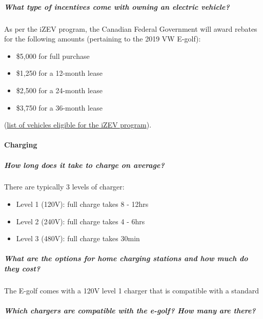 \documentclass[]{article}
\providecommand{\tightlist}{%
  \setlength{\itemsep}{0pt}\setlength{\parskip}{0pt}}
\let\oldparagraph\paragraph
\renewcommand{\paragraph}[1]{\oldparagraph{#1}\mbox{}}
\let\oldsubparagraph\subparagraph
\renewcommand{\subparagraph}[1]{\oldsubparagraph{#1}\mbox{}}
\begin{document}
\hypertarget{what-type-of-incentives-come-with-owning-an-electric-vehicle}{%
\subparagraph{What type of incentives come with owning an electric
vehicle?}\label{what-type-of-incentives-come-with-owning-an-electric-vehicle}}

As per the iZEV program, the Canadian Federal Government will award
rebates for the following amounts (pertaining to the 2019 VW E-golf):

\begin{itemize}
\tightlist
\item
  \$5,000 for full purchase
\item
  \$1,250 for a 12-month lease
\item
  \$2,500 for a 24-month lease
\item
  \$3,750 for a 36-month lease
\end{itemize}

(\href{https://www.tc.gc.ca/en/services/road/innovative-technologies/list-eligible-vehicles-under-izev-program.html}{list
of vehicles eligible for the iZEV program}).

\hypertarget{charging}{%
\paragraph{Charging}\label{charging}}

\hypertarget{how-long-does-it-take-to-charge-on-average}{%
\subparagraph{How long does it take to charge on
average?}\label{how-long-does-it-take-to-charge-on-average}}

There are typically 3 levels of charger:

\begin{itemize}
\item
  Level 1 (120V): full charge takes 8 - 12hrs
\item
  Level 2 (240V): full charge takes 4 - 6hrs
\item
  Level 3 (480V): full charge takes 30min
\end{itemize}

\hypertarget{what-are-the-options-for-home-charging-stations-and-how-much-do-they-cost}{%
\subparagraph{What are the options for home charging stations and how
much do they
cost?}\label{what-are-the-options-for-home-charging-stations-and-how-much-do-they-cost}}

The E-golf comes with a 120V level 1 charger that is compatible with a
standard

\hypertarget{which-chargers-are-compatible-with-the-e-golf-how-many-are-there}{%
\subparagraph{Which chargers are compatible with the e-golf? How many
are
there?}\label{which-chargers-are-compatible-with-the-e-golf-how-many-are-there}}
\end{document}
